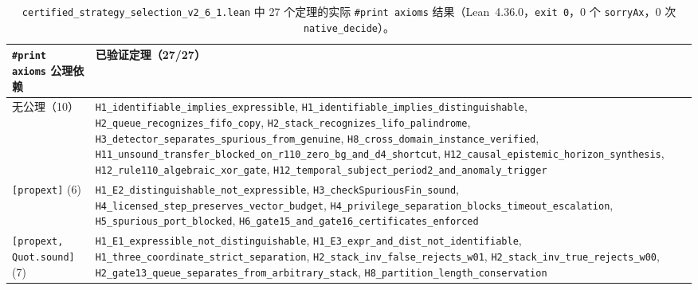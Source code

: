 \documentclass[11pt,a4paper]{article}
\theoremstyle{cleanthm}
\theoremstyle{cleandef}
\begin{document}
\begin{table}[!htbp]
\centering
\caption{\texttt{certified\_strategy\_selection\_v2\_6\_1.lean} 中 27 个定理的实际 \texttt{\#print axioms} 结果（Lean~4.36.0，\texttt{exit 0}，0 个 \texttt{sorryAx}，0 次 \texttt{native\_decide}）。}
\label{tab:axioms_v26}
\footnotesize
\begin{tabularx}{\linewidth}{@{}l >{\raggedright\arraybackslash}X@{}}
\toprule
\textbf{\texttt{\#print axioms} 公理依赖} & \textbf{已验证定理（27/27）} \\
\midrule
无公理（10） & \texttt{H1\_identifiable\_\allowbreak implies\_\allowbreak expressible}, \texttt{H1\_identifiable\_\allowbreak implies\_\allowbreak distinguishable}, \texttt{H2\_queue\_\allowbreak recognizes\_\allowbreak fifo\_\allowbreak copy}, \texttt{H2\_stack\_\allowbreak recognizes\_\allowbreak lifo\_\allowbreak palindrome}, \texttt{H3\_detector\_\allowbreak separates\_\allowbreak spurious\_\allowbreak from\_\allowbreak genuine}, \texttt{H8\_cross\_\allowbreak domain\_\allowbreak instance\_\allowbreak verified}, \texttt{H11\_unsound\_\allowbreak transfer\_\allowbreak blocked\_\allowbreak on\_\allowbreak r110\_\allowbreak zero\_\allowbreak bg\_\allowbreak and\_\allowbreak d4\_\allowbreak shortcut}, \texttt{H12\_causal\_\allowbreak epistemic\_\allowbreak horizon\_\allowbreak synthesis}, \texttt{H12\_rule110\_\allowbreak algebraic\_\allowbreak xor\_\allowbreak gate}, \texttt{H12\_temporal\_\allowbreak subject\_\allowbreak period2\_\allowbreak and\_\allowbreak anomaly\_\allowbreak trigger} \\
\texttt{[propext]} (6) & \texttt{H1\_E2\_distinguishable\_\allowbreak not\_\allowbreak expressible}, \texttt{H3\_checkSpuriousFin\_sound}, \texttt{H4\_licensed\_\allowbreak step\_\allowbreak preserves\_\allowbreak vector\_\allowbreak budget}, \texttt{H4\_privilege\_\allowbreak separation\_\allowbreak blocks\_\allowbreak timeout\_\allowbreak escalation}, \texttt{H5\_spurious\_\allowbreak port\_\allowbreak blocked}, \texttt{H6\_gate15\_\allowbreak and\_\allowbreak gate16\_\allowbreak certificates\_\allowbreak enforced} \\
\texttt{[propext, Quot.sound]} (7) & \texttt{H1\_E1\_expressible\_\allowbreak not\_\allowbreak distinguishable}, \texttt{H1\_E3\_expr\_\allowbreak and\_\allowbreak dist\_\allowbreak not\_\allowbreak identifiable}, \texttt{H1\_three\_\allowbreak coordinate\_\allowbreak strict\_\allowbreak separation}, \texttt{H2\_stack\_\allowbreak inv\_\allowbreak false\_\allowbreak rejects\_\allowbreak w01}, \texttt{H2\_stack\_\allowbreak inv\_\allowbreak true\_\allowbreak rejects\_\allowbreak w00}, \texttt{H2\_gate13\_\allowbreak queue\_\allowbreak separates\_\allowbreak from\_\allowbreak arbitrary\_\allowbreak stack}, \texttt{H8\_partition\_\allowbreak length\_\allowbreak conservation} \\

\end{tabularx}
\end{table}
\end{document}

